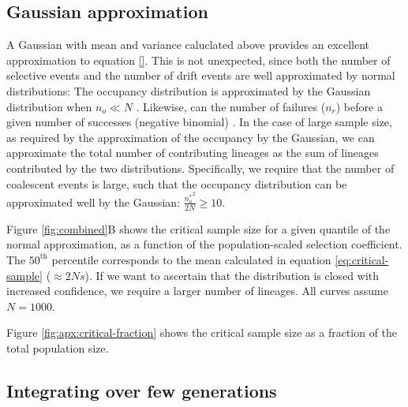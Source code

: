 \documentclass[review]{elsarticle}
\newcommand{\sgcomment}[1]{{\color{red}{SG: #1}}}
\begin{document}
\subsection{Gaussian approximation}


A Gaussian with mean and variance caluclated above provides an excellent approximation to 
equation \eqref{}.
This is not unexpected, since both the number of selective events and the number of drift events 
are well approximated by normal distributions: The occupancy distribution is approximated by the Gaussian 
distribution when $n_o \ll N$ \citep{ONeill2019}.
 Likewise, can the number of failures ($n_r$) before a given number of successes
(negative binomial) \sgcomment{reference?}. In the case of large sample size, as required by the approximation of the
occupancy by the Gaussian, we can approximate the total number of contributing lineages as the sum
of lineages \sgcomment{??}contributed by the two distributions. Specifically, we require that the number of
coalescent events is large, such that the occupancy distribution can be approximated well by the
Gaussian: $\frac{{n_o^*}^2}{2N} \ge 10$. \sgcomment{I am confused by this paragraph.}


Figure \ref{fig:combined}B shows the critical sample size for a given quantile of the normal
approximation, as a function of the population-scaled selection coefficient. The $50^{\text{th}}$
percentile corresponds to the mean calculated in equation \ref{eq:critical-sample} ($\approx 2Ns$).
If we want to ascertain that the distribution is closed with increased confidence, we require a
larger number of lineages. All curves assume $N=1000$.

Figure \ref{fig:apx:critical-fraction} shows the critical sample size as a fraction of the total
population size.

\subsection
{Integrating over few generations} 
\end{document}
